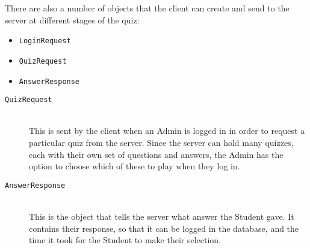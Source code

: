 \begin{enumerate}
	There are also a number of objects that the client can create and send to
	the server at different stages of the quiz:
	\begin{itemize}
		\item \texttt{LoginRequest}
		\item \texttt{QuizRequest}
		\item \texttt{AnswerResponse}
	\end{itemize}

	\begin{description}
		\item[\texttt{QuizRequest}]\hfill \\ This is sent by the client when an
		Admin is logged in in order to request a particular quiz from the
		server. Since the server can hold many quizzes, each with their own set
		of questions and answers, the Admin has the option to choose which of
		these to play when they log in.

		\item[\texttt{AnswerResponse}]\hfill \\ This is the object that tells
		the server what answer the Student gave. It contains their response, so
		that it can be logged in the database, and the time it took for the
		Student to make their selection.
	\end{description}

\end{enumerate}
